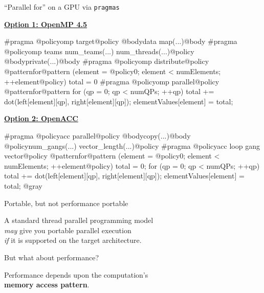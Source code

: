 
\begin{frame}[fragile]{``Parallel for'' on a GPU via \texttt{pragmas}}

  \textbf{\ul{Option 1: OpenMP 4.5}}

  \begin{code}[linebackgroundcolor={
        \btLstHL<1->{5,7-9}{bodyColor}
      }
    ]
#pragma @policyomp target@policy @bodydata map(...)@body
#pragma @policyomp teams num_teams(...) num_threads(...)@policy @bodyprivate(...)@body
#pragma @policyomp distribute@policy
@patternfor@pattern (element = @policy0; element < numElements; ++element@policy) {
  total = 0
#pragma @policyomp parallel@policy @patternfor@pattern
  for (qp = 0; qp < numQPs; ++qp)
    total += dot(left[element][qp], right[element][qp]);
  elementValues[element] = total;
}
  \end{code}

  \pause
  \textbf{\ul{Option 2: OpenACC}}

  \begin{code}[linebackgroundcolor={
        \btLstHL<2->{4-7}{bodyColor}
      }
    ]
#pragma @policyacc parallel@policy @bodycopy(...)@body @policynum_gangs(...) vector_length(...)@policy
#pragma @policyacc loop gang vector@policy
@patternfor@pattern (element = @policy0; element < numElements; ++element@policy) {
  total = 0;
  for (qp = 0; qp < numQPs; ++qp)
    total += dot(left[element][qp], right[element][qp]);
  elementValues[element] = total;
}@gray
  \end{code}

\end{frame}


\begin{frame}{Portable, but not performance portable}

 \Large A standard thread parallel programming model \\
   \hspace{10pt} \textit{may} give you portable parallel execution \\
   \hspace{10pt} \textit{if} it is supported on the target architecture.

 \vspace{12pt}

 {\Large But what about performance?}

 \vspace{12pt}

 \pause

 {\Large Performance depends upon the computation's
   \\ \textbf{memory access pattern}.}

\end{frame}

